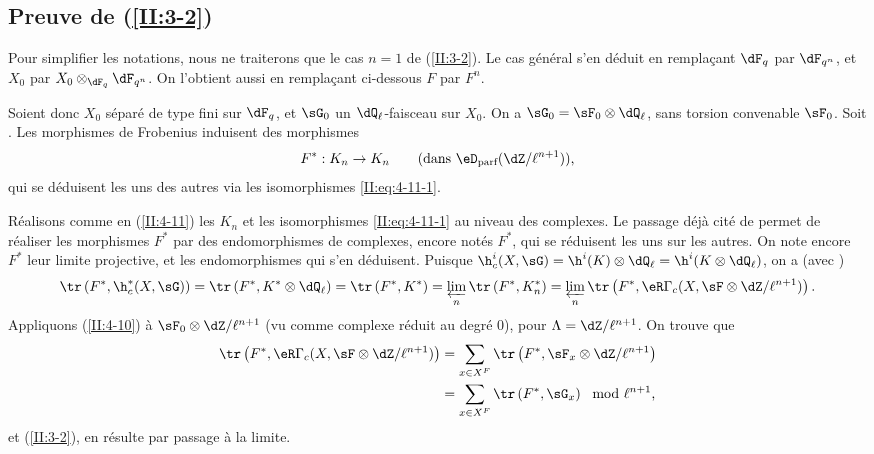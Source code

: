 \subsection{Preuve de \texorpdfstring{(\ref{II:3-2})}{(3.2)}}\label{II:4-13}

Pour simplifier les notations, nous ne traiterons que le cas $n=1$ de 
(\ref{II:3-2}). Le cas général s'en déduit en remplaçant $\dF_q$ par $\dF_{q^n}$, et $X_0$ par $X_0\otimes_{\dF_q}\dF_{q^n}$. On l'obtient aussi en remplaçant ci-dessous 
$F$ par $F^n$. 

Soient donc $X_0$ séparé de type fini sur $\dF_q$, et $\sG_0$ un 
$\dQ_\ell$-faisceau sur $X_0$. On a $\sG_0=\sF_0\otimes\dQ_\ell$,  sans torsion convenable $\sF_0$. Soit 
. Les morphismes de Frobenius induisent 
des morphismes 
\[
  F^* : K_n\to K_n \qquad \text{(dans $\eD_\text{parf}(\dZ/\ell^{n+1})$),}
\]
qui se déduisent les uns des autres via les isomorphismes 
\eqref{II:eq:4-11-1}. 

Réalisons comme en (\ref{II:4-11}) les $K_n$ et les isomorphismes 
\eqref{II:eq:4-11-1} au niveau des complexes. Le passage déjà cité de 
 permet de réaliser les morphismes $F^*$ par des 
endomorphismes de complexes, encore notés $F^*$, qui se réduisent les uns 
sur les autres. On note encore $F^*$ leur limite projective, et les 
endomorphismes qui s'en déduisent. Puisque 
$\h_c^i(X,\sG) = \h^i(K)\otimes\dQ_\ell = \h^i(K\otimes\dQ_\ell)$, on a (avec 
) 
\[
  \tr\left(F^*, \h_c^*(X,\sG)\right) = \tr\left(F^*,K^*\otimes\dQ_\ell\right) = \tr\left(F^*,K^*\right) = \varprojlim_n \tr\left(F^*,K_n^*\right) = \varprojlim_n \tr\left(F^*,\eR\Gamma_c(X,\sF\otimes\dZ/\ell^{n+1})\right) \text{.}
\]
Appliquons (\ref{II:4-10}) à $\sF_0\otimes\dZ/\ell^{n+1}$ (vu comme complexe 
réduit au degré $0$), pour $\Lambda=\dZ/\ell^{n+1}$. On trouve que 
\begin{align*}
  \tr\left(F^*,\eR\Gamma_c(X,\sF\otimes\dZ/\ell^{n+1})\right) 
    &= \sum_{x\in X^F} \tr\left(F^*,\sF_x\otimes\dZ/\ell^{n+1}\right) \\
    &= \sum_{x\in X^F} \tr\left(F^*,\sG_x\right) \mod \ell^{n+1} \text{,}
\end{align*}
et (\ref{II:3-2}), en résulte par passage à la limite. 











